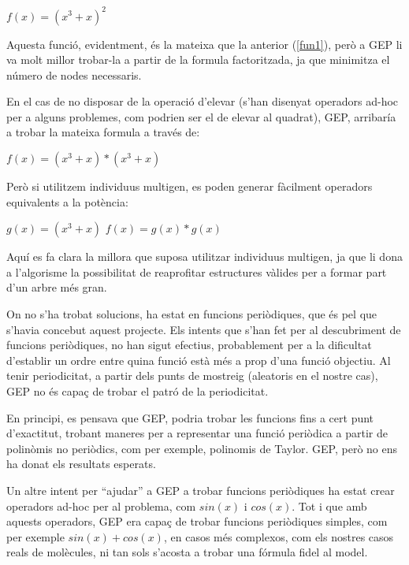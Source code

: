 \documentclass[titlepage,a4paper,12pt]{book}
\begin{document}
\begin{center}
	$f(x) = (x^3 + x)^2 $
\end{center}

Aquesta funció, evidentment, és la mateixa que la anterior (\ref{fun1}), però a GEP li va molt
millor trobar-la a partir de la formula factoritzada, ja que minimitza el número de nodes
necessaris.

En el cas de no disposar de la operació d'elevar (s'han disenyat operadors ad-hoc per a alguns
problemes, com podrien ser el de elevar al quadrat), GEP, arribaría a trobar la mateixa formula a
través de:

\begin{center}
	$f(x) = (x^3 + x) * (x^3 + x) $
\end{center}


Però si utilitzem individuus multigen, es poden generar fàcilment operadors equivalents a la
potència:

\begin{center}
	$g(x) = (x^3 + x)$
	$f(x) = g(x) * g(x)$
\end{center}

Aquí es fa clara la millora que suposa utilitzar individuus multigen, ja que li dona a l'algorisme
la possibilitat de reaprofitar estructures vàlides per a formar part d'un arbre més gran.

On no s'ha trobat solucions, ha estat en funcions periòdiques, que és pel que s'havia concebut
aquest projecte.  Els intents que s'han fet per al descubriment de funcions periòdiques, no han
sigut efectius, probablement per a la dificultat d'establir un ordre entre quina funció està més a
prop d'una funció objectiu.  Al tenir periodicitat, a partir dels punts de mostreig (aleatoris en
el nostre cas), GEP no és capaç de trobar el patró de la periodicitat.

En principi, es pensava que GEP, podria trobar les funcions fins a cert punt d'exactitut, trobant
maneres per a representar una funció periòdica a partir de polinòmis no periòdics, com per exemple,
polinomis de Taylor. GEP, però no ens ha donat els resultats esperats.

Un altre intent per ``ajudar'' a GEP a trobar funcions periòdiques ha estat crear operadors ad-hoc
per al problema, com $sin(x)$ i $cos(x)$.  Tot i que amb aquests operadors, GEP era capaç de trobar
funcions periòdiques simples, com per exemple $sin(x)+cos(x)$, en casos més complexos, com els
nostres casos reals de molècules, ni tan sols s'acosta a trobar una fórmula fidel al model.

\end{document}
